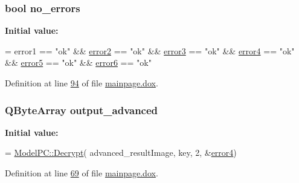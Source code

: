 \subsubsection[{\texorpdfstring{no\+\_\+errors}{no_errors}}]{\setlength{\rightskip}{0pt plus 5cm}bool no\+\_\+errors}\hypertarget{mainpage_8dox_a3a32a631757c3fe2d38655ea361cb2cc}{}\label{mainpage_8dox_a3a32a631757c3fe2d38655ea361cb2cc}
{\bfseries Initial value\+:}
\begin{DoxyCode}
=
        error1 == \textcolor{stringliteral}{"ok"} &&
        \hyperlink{mainpage_8dox_a019326b383003608b449e099257babad}{error2} == \textcolor{stringliteral}{"ok"} &&
        \hyperlink{mainpage_8dox_a0a5bd4c1e9106a6efb2b5ab3cbb58e29}{error3} == \textcolor{stringliteral}{"ok"} &&
        \hyperlink{mainpage_8dox_adaaa766e0e5f054f58075fa0583c7ea2}{error4} == \textcolor{stringliteral}{"ok"} &&
        \hyperlink{mainpage_8dox_ad35f2250b1706e4aefd45d82d2aa1255}{error5} == \textcolor{stringliteral}{"ok"} &&
        \hyperlink{mainpage_8dox_a92da3be57b27bb827f55e05120cb9827}{error6} == \textcolor{stringliteral}{"ok"}
\end{DoxyCode}


Definition at line \hyperlink{mainpage_8dox_source_l00094}{94} of file \hyperlink{mainpage_8dox_source}{mainpage.\+dox}.

\subsubsection[{\texorpdfstring{output\+\_\+advanced}{output_advanced}}]{\setlength{\rightskip}{0pt plus 5cm}Q\+Byte\+Array output\+\_\+advanced}\hypertarget{mainpage_8dox_afda71a8afe6713d362810784355a3b3f}{}\label{mainpage_8dox_afda71a8afe6713d362810784355a3b3f}
{\bfseries Initial value\+:}
\begin{DoxyCode}
= \hyperlink{class_model_p_c_a902abaea4f07995b48c0f2fea6eceb7c}{ModelPC::Decrypt}(
        advanced\_resultImage,
        key,
        2,
        &\hyperlink{mainpage_8dox_adaaa766e0e5f054f58075fa0583c7ea2}{error4})
\end{DoxyCode}


Definition at line \hyperlink{mainpage_8dox_source_l00069}{69} of file \hyperlink{mainpage_8dox_source}{mainpage.\+dox}.

